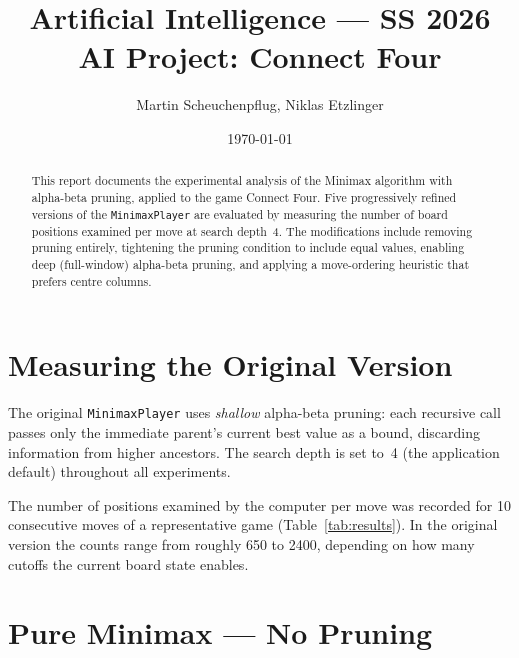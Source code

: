 \documentclass[language=english,titlepage=false,smartquotes=true]{hgbreport}
\begin{document}

\author{Martin Scheuchenpflug, Niklas Etzlinger}
\title{Artificial Intelligence --- SS 2026\\
       AI Project: Connect Four}
\date{\today}

\maketitle

\begin{abstract}\noindent
This report documents the experimental analysis of the Minimax algorithm with
alpha-beta pruning, applied to the game Connect Four. Five progressively
refined versions of the \texttt{MinimaxPlayer} are evaluated by measuring the
number of board positions examined per move at search depth~4. The
modifications include removing pruning entirely, tightening the pruning
condition to include equal values, enabling deep (full-window) alpha-beta
pruning, and applying a move-ordering heuristic that prefers centre columns.
\end{abstract}

\section{Measuring the Original Version}

The original \texttt{MinimaxPlayer} uses \emph{shallow} alpha-beta pruning:
each recursive call passes only the immediate parent's current best value as a
bound, discarding information from higher ancestors. The search depth is set
to~4 (the application default) throughout all experiments.

The number of positions examined by the computer per move was recorded for
10 consecutive moves of a representative game (Table~\ref{tab:results}).
In the original version the counts range from roughly 650 to 2400, depending
on how many cutoffs the current board state enables.

\section{Pure Minimax --- No Pruning}
\label{sec:q2}
\end{document}
